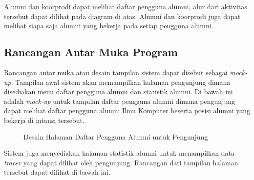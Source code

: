 Alumni dan koorprodi dapat melihat daftar pengguna alumni, alur dari aktivitas tersebut dapat dilihat pada diagram di atas. Alumni dan koorprodi juga dapat melihat siapa saja alumni yang bekerja pada setiap pengguna alumni. 

\subsection{Rancangan Antar Muka Program}

Rancangan antar muka atau desain tampilan sistem dapat disebut sebagai \textit{mock-up}. Tampilan awal sistem akan memampilkan halaman pengunjung dimana disediakan menu daftar pengguna alumni dan statistik alumni. Di bawah ini adalah \textit{mock-up} untuk tampilan daftar pengguna alumni dimana pengunjung dapat melihat daftar pengguna alumni Ilmu Komputer beserta posisi alumni yang bekerja di intansi tersebut. 

\begin{figure}[H]
	\centering
	\caption{Desain Halaman Daftar Pengguna Alumni untuk Pengunjung}
	\label{pengunjung_daftarpengguna}
\end{figure}

Sistem juga menyediakan halaman statistik alumni untuk menampilkan data \textit{tracer} yang dapat dilihat oleh pengunjung. Rancangan dari tampilan halaman tersebut dapat dilihat di bawah ini.

